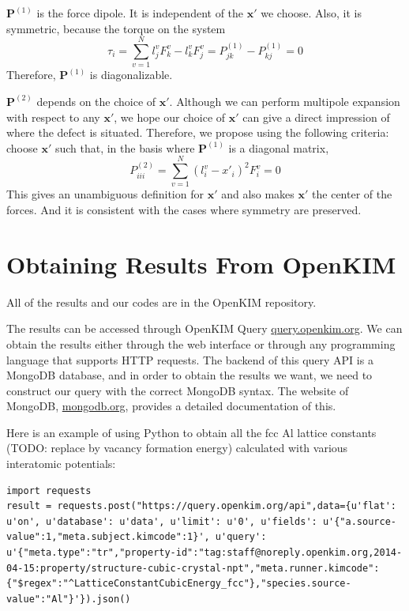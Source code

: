 \documentclass[%
 reprint,
 amsmath,amssymb,
 aps,
]{revtex4-1}
\begin{document}
$\bm{P}^{(1)}$ is the force dipole.
It is independent of the $\bm{x'}$ we choose.
Also, it is symmetric, because the torque on the system
\begin{equation}
  \tau_i = \sum_{v=1}^N l_j^v F_k^v - l_k^v F_j^v = P_{jk}^{(1)} - P_{kj}^{(1)} = 0
\end{equation}
Therefore, $\bm{P}^{(1)}$ is diagonalizable.

$\bm{P}^{(2)}$ depends on the choice of $\bm{x'}$.
Although we can perform multipole expansion with respect to any $\bm{x'}$, we hope our choice of $\bm{x'}$ can give a direct impression of where the defect is situated.
Therefore, we propose using the following criteria:
choose $\bm{x'}$ such that, in the basis where $\bm{P}^{(1)}$ is a diagonal matrix,
\begin{equation}
  P_{iii}^{(2)} = \sum_{v=1}^N (l_i^v-x'_i)^2 F_i^v = 0
\end{equation}
This gives an unambiguous definition for $\bm{x'}$ and also makes $\bm{x'}$ the center of the forces.
And it is consistent with the cases where symmetry are preserved.

%


\section{Obtaining Results From OpenKIM}
\label{app:data}
All of the results and our codes are in the OpenKIM repository.

The results can be accessed through OpenKIM Query \url{query.openkim.org}.
We can obtain the results either through the web interface or through any programming language that supports HTTP requests.
The backend of this query API is a MongoDB database, and in order to obtain the results we want, we need to construct our query with the correct MongoDB syntax.
The website of MongoDB, \url{mongodb.org}, provides a detailed documentation of this.

Here is an example of using Python to obtain all the fcc Al lattice constants (TODO: replace by vacancy formation energy) calculated with various interatomic potentials:
\begin{lstlisting}
import requests
result = requests.post("https://query.openkim.org/api",data={u'flat': u'on', u'database': u'data', u'limit': u'0', u'fields': u'{"a.source-value":1,"meta.subject.kimcode":1}', u'query': u'{"meta.type":"tr","property-id":"tag:staff@noreply.openkim.org,2014-04-15:property/structure-cubic-crystal-npt","meta.runner.kimcode":{"$regex":"^LatticeConstantCubicEnergy_fcc"},"species.source-value":"Al"}'}).json()
\end{lstlisting}
\end{document}
